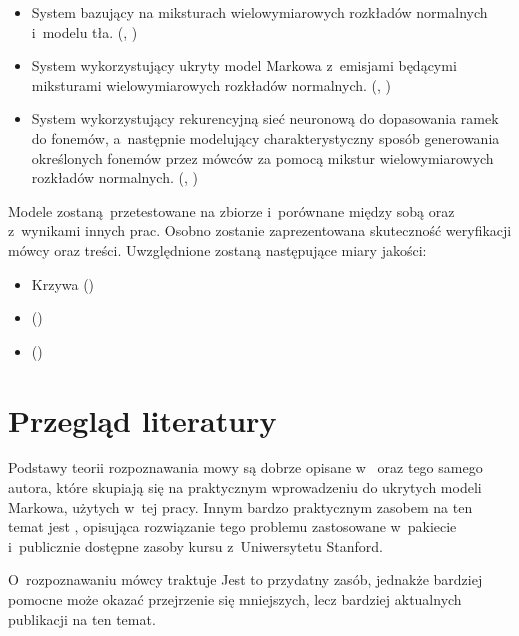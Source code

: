 \begin{itemize}
    \item System bazujący na miksturach wielowymiarowych rozkładów normalnych i~modelu tła. (, )
    \item System wykorzystujący ukryty model Markowa z~emisjami będącymi miksturami wielowymiarowych rozkładów normalnych. (, )
    \item System wykorzystujący rekurencyjną sieć neuronową do dopasowania ramek do fonemów, a~następnie modelujący charakterystyczny sposób generowania określonych fonemów przez mówców za pomocą mikstur wielowymiarowych rozkładów normalnych. (, )
\end{itemize}

Modele zostaną przetestowane na zbiorze  i~porównane między sobą oraz z~wynikami innych prac.
Osobno zostanie zaprezentowana skuteczność weryfikacji mówcy oraz treści. Uwzględnione zostaną następujące miary jakości:

\begin{itemize}
    \item Krzywa  ()
    \item {} ()
    \item {} ()
\end{itemize}

\section{Przegląd literatury}\label{sec:przeglad_literatury}

Podstawy teorii rozpoznawania mowy są dobrze opisane w~\cite{fundamentalsOfSpeech}
oraz \cite{aTutorialOnHidden} tego samego autora, które skupiają się na praktycznym wprowadzeniu
do ukrytych modeli Markowa, użytych w~tej pracy.
Innym bardzo praktycznym zasobem na ten temat jest \cite{theHtkBook}, opisująca rozwiązanie
tego problemu zastosowane w~pakiecie  i~publicznie dostępne zasoby
kursu  z~Uniwersytetu Stanford.

O~rozpoznawaniu mówcy traktuje \cite{fundamentalsOfSpeaker}
Jest to przydatny zasób, jednakże bardziej pomocne może okazać przejrzenie się mniejszych, lecz
bardziej aktualnych publikacji na ten temat.

